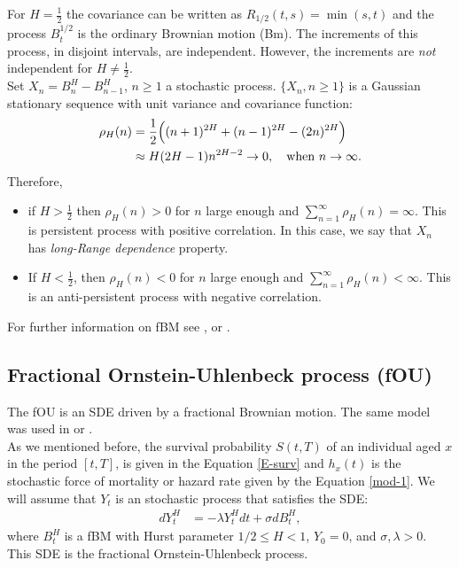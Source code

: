 \documentclass[smallextended]{svjour3}
\begin{document}
For $H =\tfrac{1}{2}$ the covariance can be written as $R_{1/2}(t,s) = 
\min(s,t)$ and the process $B_t^{1/2}$ is
the ordinary Brownian motion (Bm). The increments of this process, in disjoint 
intervals, are independent. However,
the increments are {\it not} independent for $H \ne\tfrac{1}{2}$.\\



Set  $X_n = B_n^H-B_{n-1}^H$, $n \ge 1$ a  stochastic process.  $\{X_n, n \ge 
1\}$ is a Gaussian stationary sequence with unit
variance and covariance function:
\begin{align*}
\rho_H (n) &= \frac{1}{2}\Big((n+1)^{2H}+ (n - 1)^{2H}-(2n)^{2H}\Big)\\
&\approx H (2H - 1)n^{2H-2} \rightarrow 0, \quad \hbox{\rm  when  } 
n\rightarrow\infty.
\end{align*}
Therefore,
\begin{itemize}
    \item if $H > \tfrac{1}{2}$ then $\rho_H(n) > 0$ for $n$ large enough and 
    $\sum_{n=1}^\infty \rho_H(n)=\infty$.
    This is persistent process with positive correlation. In this case, we say 
    that $X_n$ has
    {\it long-Range dependence} property.
    \item If $H < \tfrac{1}{2}$, then $\rho_H(n) < 0$ for $n$ large enough and 
    $\sum_{n=1}^\infty \rho_H(n)<\infty$. This is an
    anti-persistent process with  negative correlation.
\end{itemize}
For further information on fBM see  \cite{ra}, \cite{nu} or \cite{mi}.

\subsection{Fractional Ornstein-Uhlenbeck process (fOU)}


The fOU is an SDE driven by a fractional Brownian motion. The same model was 
used in \cite{mi-pr}
or \cite{gi-or-be}.\\

As we mentioned before, the survival probability $S(t,T)$ of an individual aged 
$x$ in the period $[t,T]$,
is given in the Equation \eqref{E-surv}
and $h_x(t)$ is the stochastic force of mortality or hazard rate given by the 
Equation \eqref{mod-1}.
We will assume that $Y_t$ is an stochastic process that satisfies the SDE:
\begin{align}
dY_t^H&=-\lambda Y_t^Hdt+\sigma dB_t^H, \label{mod2}
\end{align}
where $B_t^H $ is a fBM with Hurst parameter $1/2 \le H< 1$,  $Y_0=0$, and 
$\sigma,\lambda> 0$.
This SDE is the fractional Ornstein-Uhlenbeck process.\\
\end{document}

